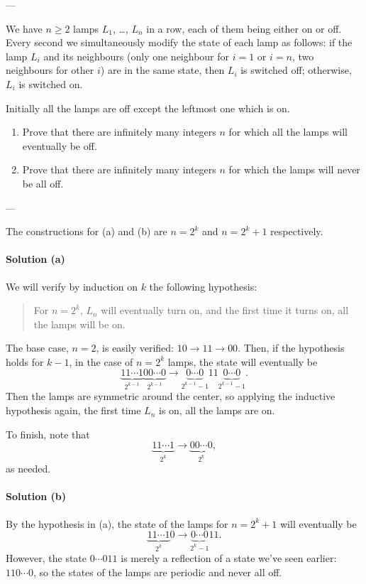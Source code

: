 
---

We have $n\ge2$ lamps $L_1$, \ldots, $L_n$ in a row, each of them being either on or off. Every second we simultaneously modify the state of each lamp as follows: if the lamp $L_i$ and its neighbours (only one neighbour for $i=1$ or $i=n$, two neighbours for other $i$) are in the same state, then $L_i$ is switched off; otherwise, $L_i$ is switched on.

Initially all the lamps are off except the leftmost one which is on.
\begin{enumerate}[label=(\alph*),itemsep=0em]
    \item Prove that there are infinitely many integers $n$ for which all the lamps will eventually be off.
    \item Prove that there are infinitely many integers $n$ for which the lamps will never be all off.
\end{enumerate}

---

The constructions for (a) and (b) are $n=2^k$ and $n=2^k+1$ respectively.

\paragraph{Solution (a)}
We will verify by induction on $k$ the following hypothesis:
\begin{quote}
    For $n=2^k$, $L_n$ will eventually turn on, and the first time it turns on, all the lamps will be on.
\end{quote}
The base case, $n=2$, is easily verified: $10\to11\to00$. Then, if the hypothesis holds for $k-1$, in the case of $n=2^k$ lamps, the state will eventually be
\[\underbrace{11\cdots1}_{2^{k-1}}\underbrace{00\cdots0}_{2^{k-1}}\to\underbrace{0\cdots0}_{2^{k-1}-1}11\underbrace{0\cdots0}_{2^{k-1}-1}.\]
Then the lamps are symmetric around the center, so applying the inductive hypothesis again, the first time $L_n$ is on, all the lamps are on.

To finish, note that
\[\underbrace{11\cdots1}_{2^k}\to\underbrace{00\cdots0}_{2^k},\]
as needed.

\paragraph{Solution (b)}
By the hypothesis in (a), the state of the lamps for $n=2^k+1$ will eventually be
\[\underbrace{11\cdots1}_{2^k}0\to\underbrace{0\cdots0}_{2^k-1}11.\]
However, the state $0\cdots011$ is merely a reflection of a state we've seen earlier: $110\cdots0$, so the states of the lamps are periodic and never all off.


